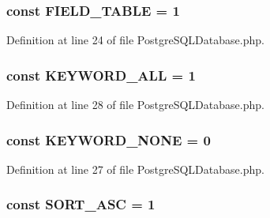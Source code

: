 \subsubsection[{F\+I\+E\+L\+D\+\_\+\+T\+A\+B\+L\+E}]{\setlength{\rightskip}{0pt plus 5cm}const F\+I\+E\+L\+D\+\_\+\+T\+A\+B\+L\+E = 1}\label{class_postgre_s_q_l_database_acbdf154a35cfc228dd1016e8aa4bd503}


Definition at line 24 of file Postgre\+S\+Q\+L\+Database.\+php.

\hypertarget{class_postgre_s_q_l_database_ababb5c4af464938f3f0b8f9c4fa183ba}{}
\subsubsection[{K\+E\+Y\+W\+O\+R\+D\+\_\+\+A\+L\+L}]{\setlength{\rightskip}{0pt plus 5cm}const K\+E\+Y\+W\+O\+R\+D\+\_\+\+A\+L\+L = 1}\label{class_postgre_s_q_l_database_ababb5c4af464938f3f0b8f9c4fa183ba}


Definition at line 28 of file Postgre\+S\+Q\+L\+Database.\+php.

\hypertarget{class_postgre_s_q_l_database_a9b1a24ef01d468c146a71b333edb0c17}{}
\subsubsection[{K\+E\+Y\+W\+O\+R\+D\+\_\+\+N\+O\+N\+E}]{\setlength{\rightskip}{0pt plus 5cm}const K\+E\+Y\+W\+O\+R\+D\+\_\+\+N\+O\+N\+E = 0}\label{class_postgre_s_q_l_database_a9b1a24ef01d468c146a71b333edb0c17}


Definition at line 27 of file Postgre\+S\+Q\+L\+Database.\+php.

\hypertarget{class_postgre_s_q_l_database_a9517f2622dfc5fbb0cc64feef247eb06}{}
\subsubsection[{S\+O\+R\+T\+\_\+\+A\+S\+C}]{\setlength{\rightskip}{0pt plus 5cm}const S\+O\+R\+T\+\_\+\+A\+S\+C = 1}\label{class_postgre_s_q_l_database_a9517f2622dfc5fbb0cc64feef247eb06}


